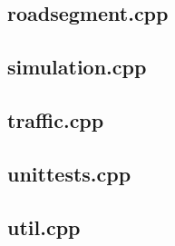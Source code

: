 \documentclass{article}
\begin{document}
  \subsection{roadsegment.cpp}
    
  \subsection{simulation.cpp}
    
  \subsection{traffic.cpp}
    
  \subsection{unittests.cpp}
    
  \subsection{util.cpp}
    
\end{document}
